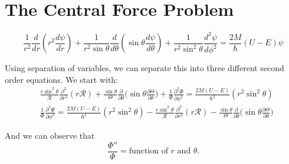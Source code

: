 \documentclass[11pt,fleqn]{book}
\begin{document}
\section{The Central Force Problem}
\begin{theorem}
    $$\frac{1}{r^2}\frac{d}{dr}\left(r^2\frac{d\psi}{dr}\right) + \frac{1}{r^2\sin\theta}\frac{d}{d\theta}\left(\sin\theta\frac{d\psi}{d\theta}\right) + \frac{1}{r^2\sin^2\theta}\frac{d^2\psi}{d\phi^2}=\frac{2M}{\hslash}(U-E)\psi$$
\end{theorem}
Using separation of variables, we can separate this into three different second order equations. We start with:
\begin{align*}
&\frac{r\sin^2\theta}{\mathcal{R}}\frac{\partial^2}{\partial r^2}(r\mathcal{R}) + \frac{\sin\theta}{\Theta}\frac{\partial}{\partial\theta}\bigg(\sin\theta\frac{\partial\Theta}{\partial\theta}\bigg)+\frac{1}{\Phi}\frac{\partial^2\Phi}{\partial\phi^2} = \frac{2M(U-E)}{\hslash^2}(r^2\sin^2\theta)\\
&\frac{1}{\Phi}\frac{\partial^2\Phi}{\partial\phi^2} = \frac{2M(U-E)}{\hslash^2}(r^2\sin^2\theta)-\frac{r\sin^2\theta}{\mathcal{R}}\frac{\partial^2}{\partial r^2}(r\mathcal{R})-\frac{\sin\theta}{\Theta}\frac{\partial}{\partial\theta}\bigg(\sin\theta\frac{\partial\Theta}{\partial\theta}\bigg)
\end{align*}

And we can observe that 
$$\frac{\Phi''}{\Phi} = \text{function of $r$ and $\theta$}.$$
\end{document}
